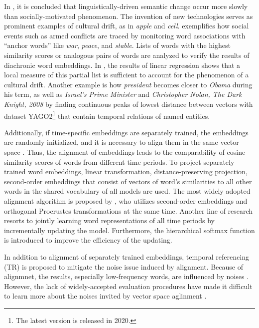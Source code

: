 In \textcite{hamilton2016cultural}, it is concluded that linguistically-driven semantic change occur more slowly than socially-motivated phenomenon. The invention of new technologies serves as prominent examples of cultural drift, as in \textit{apple} and \textit{cell}. \textcite{kutuzov2017tracing} exemplifies how social events such as armed conflicts are traced by monitoring word associations with ``anchor words'' like \textit{war}, \textit{peace}, and \textit{stable}. Lists of words with the highest similarity scores or analogous pairs of words are analyzed to verify the results of diachronic word embeddings. In \textcite{hamilton2016cultural}, the results of linear regression shows that a local measure of this partial list is sufficient to account for the phenomenon of a cultural drift. Another example is how \textit{president} becomes closer to \textit{Obama} during his term, as well as \textit{Israel’s Prime Minister} and \textit{Christopher Nolan, The
Dark Knight, 2008} \parencite{rosin2017learning} by finding continuous peaks of lowest distance between vectors with dataset YAGO2\footnote{The latest version is released in 2020.} that contain temporal relations of named entities.

Additionally, if time-specific embeddings are separately trained, the embeddings are randomly initialized, and it is necessary to align them in the same vector space \parencite{hamilton2016law}. Thus, the alignment of embeddings leads to the comparability of cosine similarity scores of words from different time periods. To project separately trained word embeddings, linear transformation, distance-preserving projection, second-order embeddings that consist of vectors of word's similarities to all other words in the shared vocabulary of all models are used. The most widely adopted alignment algorithm is proposed by \textcite{hamilton2016law}, who utilizes second-order embeddings and orthogonal Procrustes transformations at the same time. Another line of research resorts to jointly learning word representations of all time periods by incrementally updating the model. Furthermore, the hierarchical softmax function is introduced to improve the efficiency of the updating.

In addition to alignment of separately trained embeddings, temporal referencing (TR) \parencite{dubossarsky2019timeforchange} is proposed to mitigate the noise issue induced by alignment. Because of alignmnet, the results, especially low-frequency words, are influenced by noises \parencite{dubossarsky2019timeforchange,dubossarsky2019timeout}. However, the lack of widely-accepted evaluation procedures have made it difficult to learn more about the noises invited by vector space aglinment \parencite{dubossarsky2019timeout}.

